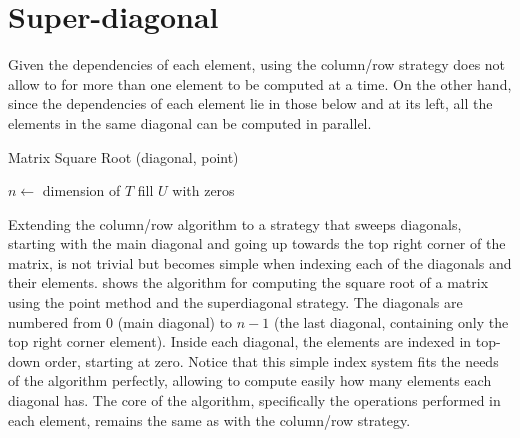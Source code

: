 \documentclass[../thesis]{subfiles}
\begin{document}
		\section{Super-diagonal}		

		Given the dependencies of each element, using the column/row strategy does not allow to for more than one element to be computed at a time. On the other hand, since the dependencies of each element lie in those below and at its left, all the elements in the same diagonal can be computed in parallel.

		\begin{algorithm}[htp]
			\caption{Matrix Square Root (diagonal, point)}
			\label{alg:multicore:diagonal:point}
			\DontPrintSemicolon


			$n \leftarrow$ dimension of $T$\;
			fill $U$ with zeros\;

		\end{algorithm}

		Extending the column/row algorithm to a strategy that sweeps diagonals, starting with the main diagonal and going up towards the top right corner of the matrix, is not trivial but becomes simple when indexing each of the diagonals and their elements.  shows the algorithm for computing the square root of a matrix using the point method and the superdiagonal strategy. The diagonals are numbered from $0$ (main diagonal) to $n-1$ (the last diagonal, containing only the top right corner element). Inside each diagonal, the elements are indexed in top-down order, starting at zero. Notice that this simple index system fits the needs of the algorithm perfectly, allowing to compute easily how many elements each diagonal has. The core of the algorithm, specifically the operations performed in each element, remains the same as with the column/row strategy.
\end{document}
